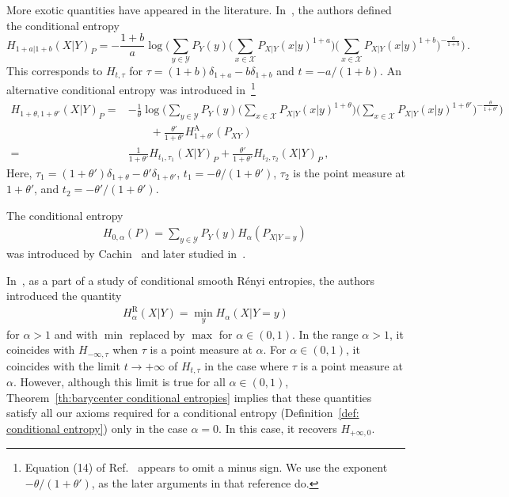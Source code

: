 \documentclass[aps,pra,11pt,onecolumn,nofootinbib,tightenlines]{revtex4-2}
\theoremstyle{definition}
\newcommand{\X}{\mathcal{X}}
\newcommand{\Y}{\mathcal{Y}}
\newcommand{\mc}[1]{\mathcal{#1}}
\begin{document}
More exotic quantities have appeared in the literature. In~\cite{tan2018conditional}, the authors defined the conditional entropy
\begin{equation}
    H_{1+a|1+b}(X|Y)_P=-\frac{1+b}{a}\log{\bigg(\sum_{y \in \Y} P_Y(y)\Big(\sum_{x \in \X} P_{X|Y}(x|y)^{1+a}\Big)\Big(\sum_{x \in \X} P_{X|Y}(x|y)^{1+b}\Big)^{-\frac{a}{1+b}}\bigg)} \,.
\end{equation}
This corresponds to $H_{t,\tau}$ for $\tau=(1+b)\delta_{1+a}-b\delta_{1+b}$ and $t=-a/(1+b)$.
An alternative conditional entropy was introduced in~\cite{hayashi2016uniform}\footnote{Equation (14) of Ref.~\cite{hayashi2016uniform} appears to omit a minus sign.  We use the exponent $-\theta/(1+\theta')$, as the later arguments in that reference do.}
\begin{align}
    H_{1+\theta,1+\theta'}(X|Y)_P=&-\frac{1}{\theta}\log{\bigg(\sum_{y \in \Y} P_Y(y)\Big(\sum_{x \in \X} P_{X|Y}(x|y)^{1+\theta}\Big)\Big(\sum_{x \in \X} P_{X|Y}(x|y)^{1+\theta'}\Big)^{-\frac{\theta}{1+\theta'}}\bigg)} \\
    &\qquad + \frac{\theta'}{1+\theta'}H^{\text{A}}_{1+\theta'}(P_{XY}) \\
    =&\frac{1}{1+\theta'}H_{t_1,\tau_1}(X|Y)_P+\frac{\theta'}{1+\theta'}H_{t_2,\tau_2}(X|Y)_P\,,
\end{align}
Here, $\tau_1=(1+\theta')\delta_{1+\theta}-\theta'\delta_{1+\theta'}$, $t_1=-\theta/(1+\theta')$, $\tau_2$ is the point measure at $1+\theta'$, and $t_2=-\theta'/(1+\theta')$.

The conditional entropy
 \begin{align}
H_{0,\alpha}(P)=\sum_{y\in\mc Y} P_Y(y)H_\alpha(P_{X|Y=y})\,
 \end{align}
 was introduced by Cachin~\cite{cachin1997entropy} and later studied in~\cite{teixeira2012conditional}.

In~\cite{renner2005simple},
as a part of a study of conditional smooth R\'enyi entropies, the authors introduced the quantity
\begin{align}
    H^{\text{R}}_\alpha(X|Y) = \min _{y} H_\alpha(X|Y=y)
\end{align}
for $\alpha > 1$ and with $\min$ replaced by $\max$ for $\alpha \in (0,1)$. In the range $\alpha>1$, it coincides with $H_{-\infty,\tau}$ when $\tau$ is a point measure at $\alpha$.
For $\alpha \in (0,1)$, it coincides with the limit $t\rightarrow +\infty$ of $H_{t,\tau}$ in the case where $\tau$ is a point measure at $\alpha$. However, although this limit is true for all $\alpha \in (0,1)$, Theorem~\ref{th:barycenter conditional entropies} implies that these quantities satisfy all our axioms required for a conditional entropy  (Definition~\ref{def: conditional entropy}) only in the case $\alpha = 0$.
In this case, it recovers \(H_{+\infty,0}\).
\end{document}
